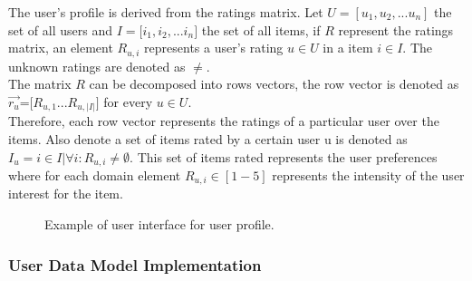 The user's profile is derived from the ratings matrix. Let
$U=[u_1,u_2,...u_n]$ the set of all users and $ I=[i_1,i_2,$...$i_n] $
the set of all items, if $R$ represent the ratings matrix,  an element
$R_{u,i}$ represents a user’s rating $u \in U$  in a item $i \in I$.
The unknown ratings are denoted as $\neq $. \\ The matrix $R$ can be
decomposed into rows vectors, the row vector is denoted as $
\overrightarrow{r_u} $=$[R_{u,1}$...$R_{u,|I|}]$ for every $u \in U$.
\\ Therefore, each row vector represents the ratings of a particular user
over the items. Also denote a set of items rated by a certain user u
is denoted as $ I_u = i \in I | \forall  i: R_{u,i} \neq \emptyset $.
This set of items rated represents the user preferences where for each
domain element $R_{u,i} \in [1-5]$ represents the intensity of the
user interest for  the item.
\begin{figure}
\captionsetup{justification=centering,margin=2cm,font=footnotesize}
\centering
\setlength\fboxsep{0pt}
\caption{Example of user interface for user profile.}
\label{fig:user-profile}      
\end{figure}

\subsubsection{User Data Model Implementation} 

